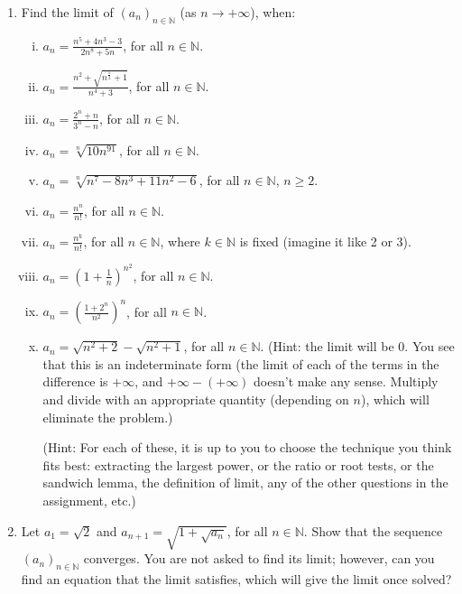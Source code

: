 \documentclass[11pt]{amsart}
\newcommand\N{{\mathbb N}}
\theoremstyle{plain}
\theoremstyle{definition}
\numberwithin{equation}{section}
\begin{document}
\begin{enumerate}
\item Find the limit of $(a_n)_{n\in\N}$ (as $n\rightarrow +\infty$), when:
\begin{enumerate}[(i)]
\item $a_n=\frac{n^5+4n^3-3}{2n^8+5n}$, for all $n\in\N$.
\vspace{0.1in}
\item $a_n=\frac{n^2+\sqrt{n^{\frac{5}{2}}+1}}{n^4+3}$, for all $n\in\N$.
\vspace{0.1in}
\item $a_n=\frac{2^n+n}{3^n-n}$, for all $n\in\N$.
\vspace{0.1in}
\item $a_n=\sqrt[n]{10n^{91}}$, for all $n\in\N$.
\vspace{0.1in}
\item $a_n=\sqrt[n]{n^7-8n^3+11n^2-6}$, for all $n\in\N$, $n\geq 2$.
\vspace{0.1in}
\item $a_n=\frac{n^n}{n!}$, for all $n\in\N$.
\vspace{0.1in}
\item $a_n=\frac{n^k}{n!}$, for all $n\in\N$, where $k\in\N$ is fixed (imagine it like 2 or 3).
\vspace{0.1in}
\item $a_n=\left(1+\frac{1}{n}\right)^{n^2}$, for all $n\in\N$.
\vspace{0.1in}
\item $a_n=\left(\frac{1+2^n}{n^2}\right)^n$, for all $n\in\N$.
\vspace{0.1in}
\item $a_n=\sqrt{n^2+2}-\sqrt{n^2+1}$, for all $n\in\N$. (Hint: the limit will be 0. You see that this is an indeterminate form (the limit of each of the terms in the difference is $+\infty$, and $+\infty - (+\infty)$ doesn't make any sense. Multiply and divide with an appropriate quantity (depending on $n$), which will eliminate the problem.)
\vspace{0.1in}

(Hint: For each of these, it is up to you to choose the technique you think fits best: extracting the largest power, or the ratio or root tests, or the sandwich lemma, the definition of limit, any of the other questions in the assignment, etc.)
\end{enumerate}
\vspace{0.4in}

\item Let $a_1=\sqrt{2}$ and $a_{n+1}=\sqrt{1+\sqrt{a_n}}$, for all $n\in\N$. Show that the sequence $(a_n)_{n\in\N}$ converges. You are not asked to find its limit; however, can you find an equation that the limit satisfies, which will give the limit once solved?

\vspace{0.4in}
\end{enumerate}
\end{document}

